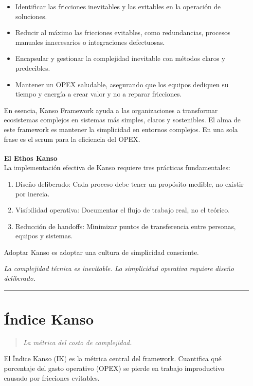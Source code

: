 \begin{itemize}
    \item Identificar las fricciones inevitables y las evitables en la operación de soluciones.
    \item Reducir al máximo las fricciones evitables, como redundancias, procesos manuales innecesarios o integraciones defectuosas.
    \item Encapsular y gestionar la complejidad inevitable con métodos claros y predecibles.
    \item Mantener un OPEX saludable, asegurando que los equipos dediquen su tiempo y energía a crear valor y no a reparar fricciones.
\end{itemize}

En esencia, Kanso Framework ayuda a las organizaciones a transformar ecosistemas complejos en sistemas más simples, 
claros y sostenibles. El alma de este framework es mantener la simplicidad en entornos complejos. 
En una sola frase es el scrum para la eficiencia del OPEX.
\\
\\
\textbf{El Ethos Kanso}
\\
La implementación efectiva de Kanso requiere tres prácticas fundamentales:
\begin{enumerate}
    \item Diseño deliberado: Cada proceso debe tener un propósito medible, no existir por inercia.
    \item Visibilidad operativa: Documentar el flujo de trabajo real, no el teórico.
    \item Reducción de handoffs: Minimizar puntos de transferencia entre personas, equipos y sistemas.
\end{enumerate}
Adoptar Kanso es adoptar una cultura de simplicidad consciente.

{\epigraph{\textit{La complejidad técnica es inevitable. La simplicidad operativa requiere diseño deliberado.}}{}}

\hrule
\section{Índice Kanso}\label{sec:ik}
\begin{quote}
\textit{La métrica del costo de complejidad.}
\end{quote}


El Índice Kanso (IK) es la métrica central del framework. Cuantifica qué porcentaje del gasto operativo (OPEX) se pierde en trabajo improductivo causado por fricciones evitables.

